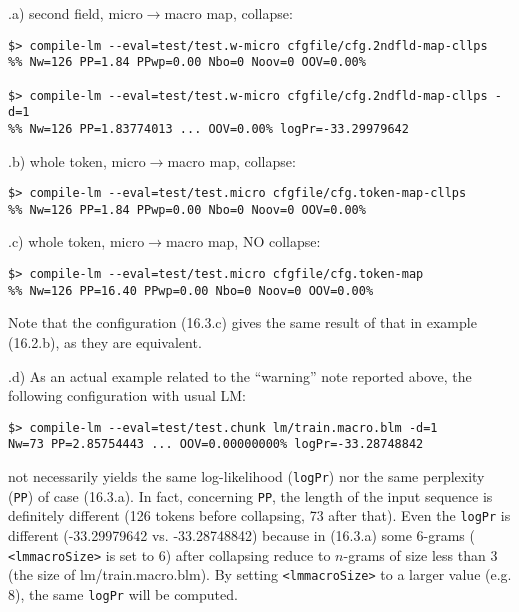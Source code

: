 \noindent \thesubsection.a) second field, micro$\rightarrow$macro map, collapse:
\begin{verbatim}
$> compile-lm --eval=test/test.w-micro cfgfile/cfg.2ndfld-map-cllps
%% Nw=126 PP=1.84 PPwp=0.00 Nbo=0 Noov=0 OOV=0.00%

$> compile-lm --eval=test/test.w-micro cfgfile/cfg.2ndfld-map-cllps -d=1
%% Nw=126 PP=1.83774013 ... OOV=0.00% logPr=-33.29979642

\end{verbatim}

\noindent
\thesubsection.b) whole token,  micro$\rightarrow$macro map, collapse:
\begin{verbatim}
$> compile-lm --eval=test/test.micro cfgfile/cfg.token-map-cllps
%% Nw=126 PP=1.84 PPwp=0.00 Nbo=0 Noov=0 OOV=0.00%
\end{verbatim}

\noindent
\thesubsection.c)  whole token,  micro$\rightarrow$macro map, NO collapse:
\begin{verbatim}
$> compile-lm --eval=test/test.micro cfgfile/cfg.token-map
%% Nw=126 PP=16.40 PPwp=0.00 Nbo=0 Noov=0 OOV=0.00%
\end{verbatim}
\noindent Note that the configuration (16.3.c) gives the same result of that in
example (16.2.b), as they are equivalent.

\bigskip
\noindent
\thesubsection.d) As an actual example related to the ``warning'' note
reported above, the following configuration with usual LM:

\begin{verbatim}
$> compile-lm --eval=test/test.chunk lm/train.macro.blm -d=1
Nw=73 PP=2.85754443 ... OOV=0.00000000% logPr=-33.28748842
\end{verbatim}

\noindent not necessarily yields the same log-likelihood ({\tt logPr}) nor the same perplexity ({\tt PP}) of case (16.3.a).
In fact, concerning {\tt PP}, the length of the input sequence is definitely different (126 tokens before collapsing, 73 after that).
Even the {\tt logPr} is different (-33.29979642 vs. -33.28748842) because in (16.3.a) some 6-grams ({\tt
<lmmacroSize>} is set to 6) after collapsing reduce to $n$-grams of size less
than 3 (the size of lm/train.macro.blm). By setting {\tt <lmmacroSize>} to
a larger value (e.g. 8), the same {\tt logPr} will be computed.


